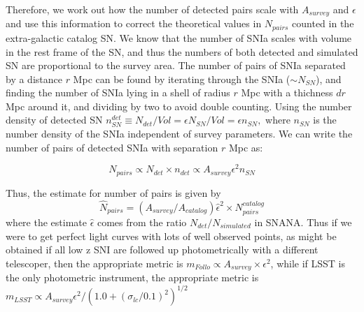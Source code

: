 Therefore, we work out how the number of detected pairs scale with $A_{survey}$ and $\epsilon$ and use this information to correct the theoretical values in $N_{pairs}$ counted in the extra-galactic catalog SN. We know that the number of SNIa scales with volume in the rest frame of the SN, and thus the numbers of both detected and simulated SN are proportional to the survey area. The number of pairs of SNIa separated by a distance $r$ Mpc can be found by iterating through the SNIa ($\sim N_{SN}$), and finding the number of SNIa lying in a shell of radius $r$ Mpc with a thichness $dr$ Mpc around it, and dividing by two to avoid double counting. Using the number density of detected SN $n^{det}_{SN} \equiv N_{det}/Vol = \epsilon N_{SN}/Vol = \epsilon n_{SN},$ where $n_{SN}$ is the number density of the SNIa independent of survey parameters. We can write the number of pairs of detected SNIa with separation $r$ Mpc as:

\begin{equation}
    N_{pairs} \propto N_{det} \times {n_{det}} \propto A_{survey} \epsilon^2 {n_{SN}}
\end{equation}

Thus, the estimate for number of pairs is given by
\begin{equation}
    \hat{N}_{pairs} = \left( A_{survey} / A_{catalog} \right)\hat{\epsilon}^2 \times N_{pairs}^{catalog}
\end{equation}
where the estimate $\hat{\epsilon}$ comes from the ratio $N_{det}/ N_{simulated}$ in SNANA. Thus if we were to get perfect light curves with lots of well observed points, as might be obtained if all low z SNI are followed up photometrically with a different telescoper, then the appropriate metric is $m_{Follo} \propto A_{survey} \times \epsilon^2$, while if LSST is the only photometric instrument, the appropriate metric is
$m_{LSST} \propto A_{survey} \epsilon^2 /(1.0 + \left(\sigma_{lc}/0.1\right)^2)^{1/2}$


